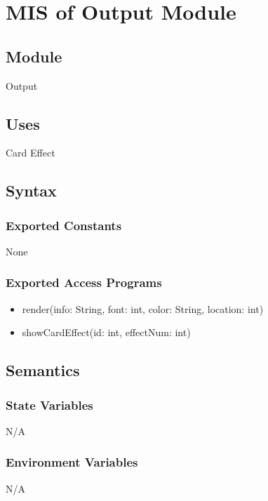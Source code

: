 \documentclass[12pt, titlepage]{article}
\begin{document}
\section{MIS of Output Module} 
\label{OM}

\subsection{Module}
\hspace{1.5em}Output

\subsection{Uses}
\hspace{1.5em}Card Effect

\subsection{Syntax}

\subsubsection{Exported Constants}
\hspace{1.5em}None

\subsubsection{Exported Access Programs}

\begin{itemize}
\item render(info: String, font: int, color: String, location: int)
\item showCardEffect(id: int, effectNum: int)
\end{itemize}

\subsection{Semantics}

\subsubsection{State Variables}
\hspace{1.5em}N/A

\subsubsection{Environment Variables}
\hspace{1.5em}N/A
\end{document}
